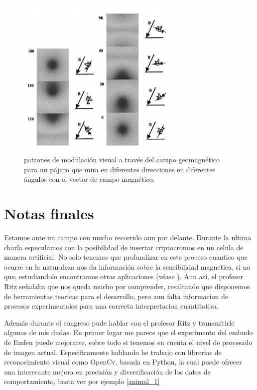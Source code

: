 \documentclass[1p]{elsarticle}
\begin{document}
\begin{figure}
	\centering
	\includegraphics[width=0.7\textwidth]{pollo_vision}
	\caption{patrones de modulación visual a través del campo geomagnético para un pájaro que mira en diferentes direcciones en diferentes ángulos con el vector de campo magnético. }
	\label{visual}
\end{figure}


\section{Notas finales}
Estamos ante un campo con mucho recorrido aun por delante. Durante la ultima charla especulamos con la posibilidad de insertar criptocromos en un celula de manera artificial. No solo tenemos que profundizar en este proceso cuantico que ocurre en la naturaleza nos da información sobre la sensibilidad magnetica, si no que, estudiandolo encontramos otras aplicaciones (véase \cite{el2017blue} ).
Aun así, el profesor Ritz señalaba que nos queda mucho por comprender, resaltando que disponemos de herramientas teoricas para el desarrollo, pero aun falta informacion de procesos experimentales para una correcta interpretacion cuantitativa. 

Además durante el congreso pude hablar con el profesor Ritz y transmitirle algunas de mis dudas. 
En primer lugar me parece que el experimento del embudo de Emlen puede mejorarse, sobre todo si tenemos en cuenta el nivel de procesado de imagen actual. Especificamente hablando he trabajo con librerias de reconocimiento visual como OpenCv, basada en Python, la cual puede ofrecer una interesante mejora en precisión y diversificación de los datos de comportamiento, basta ver por ejemplo \ref{animal_1}
\end{document}
